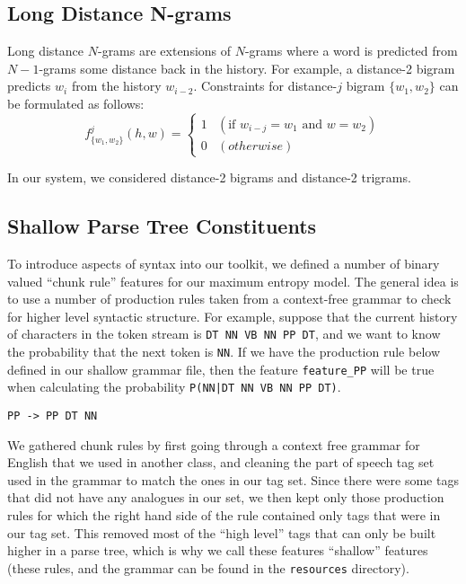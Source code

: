 \documentclass[11pt]{article}
\begin{document}
\subsection{Long Distance N-grams}
\label{sec:longdistance}

Long distance $N$-grams are extensions of $N$-grams where a word is predicted from $N-1$-grams some distance back in the history.
For example, a distance-2 bigram predicts $w_i$ from the history $w_{i-2}$.
Constraints for distance-$j$ bigram $\{w_1, w_2\}$ can be formulated as follows:
\[
  f_{\{w_1, w_2\}}^{j}(h, w) = \begin{cases}
    1 & (\textrm{if } w_{i-j} = w_1 \textrm{ and } w = w_2) \\
    0 & (otherwise)
  \end{cases}
\]

\noindent
In our system, we considered distance-2 bigrams and distance-2 trigrams.

\subsection{Shallow Parse Tree Constituents}
\label{sec:constituent}

To introduce aspects of syntax into our toolkit, we defined a number of
binary valued ``chunk rule'' features for our maximum entropy model. The
general idea is to use a number of production rules taken from a
context-free grammar to check for higher level syntactic structure. For
example, suppose that the current history of characters in the token
stream is \texttt{DT NN VB NN PP DT}, and we want to know the
probability that the next token is \texttt{NN}. If we have the 
production rule below defined in our shallow grammar file, then the
feature \texttt{feature\_PP} will be true when calculating the
probability \texttt{P(NN|DT NN VB NN PP DT)}.

\begin{verbatim}
PP -> PP DT NN
\end{verbatim}

We gathered chunk rules by first going through a context free grammar
for English that we used in another class, and cleaning the part of
speech tag set used in the grammar to match the ones in our tag set.
Since there were some tags that did not have any analogues in our set,
we then kept only those production rules for which the right hand side
of the rule contained only tags that were in our tag set. This removed
most of the ``high level'' tags that can only be built higher in a parse
tree, which is why we call these features ``shallow'' features (these
rules, and the grammar can be found in the \texttt{resources}
directory).
\end{document}
